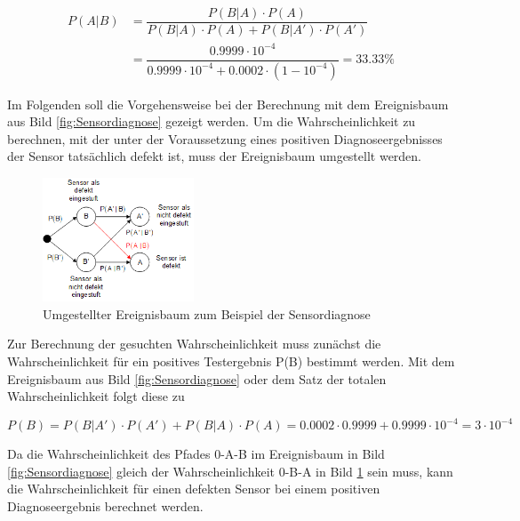 \begin{equation}\label{eq:twoeightyfive}
\begin{split}
P(A|B) & = \dfrac{P(B|A)\cdot P(A)}{P(B|A)\cdot P(A)+P(B|A')\cdot P(A')} \\ 
& = \dfrac{0.9999\cdot 10^{-4} }{0.9999\cdot 10^{-4} +0.0002\cdot \left(1-10^{-4} \right)}  = 33.33 \% 
\end{split}
\end{equation}

\noindent Im Folgenden soll die Vorgehensweise bei der Berechnung mit dem Ereignisbaum aus Bild \ref{fig:Sensordiagnose} gezeigt werden. Um die Wahrscheinlichkeit zu berechnen, mit der unter der Voraussetzung eines positiven Diagnoseergebnisses der Sensor tats\"{a}chlich defekt ist, muss der Ereignisbaum umgestellt werden.

\noindent 
\begin{figure}[H]
  \centerline{\includegraphics[width=0.4\textwidth]{Kapitel2/Bilder/image15}}
  \caption{Umgestellter Ereignisbaum zum Beispiel der Sensordiagnose}
  \label{fig:UmgestellterEreignisbaumSensordiagnose}
\end{figure}

\noindent Zur Berechnung der gesuchten Wahrscheinlichkeit muss zun\"{a}chst die Wahrscheinlichkeit f\"{u}r ein positives Testergebnis P(B) bestimmt werden. Mit dem Ereignisbaum aus Bild \ref{fig:Sensordiagnose} oder dem Satz der totalen Wahrscheinlichkeit folgt diese zu

\begin{equation}\label{eq:twoeightysix}
P(B)=P(B|A')\cdot P(A')+P(B|A)\cdot P(A)=0.0002\cdot 0.9999+0.9999\cdot 10^{-4} =3\cdot 10^{-4}
\end{equation}

\noindent Da die Wahrscheinlichkeit des Pfades 0-A-B im Ereignisbaum in Bild \ref{fig:Sensordiagnose} gleich der Wahrscheinlichkeit 0-B-A in Bild \ref{fig:UmgestellterEreignisbaumSensordiagnose} sein muss, kann die Wahrscheinlichkeit f\"{u}r einen defekten Sensor bei einem positiven Diagnoseergebnis berechnet werden. 

